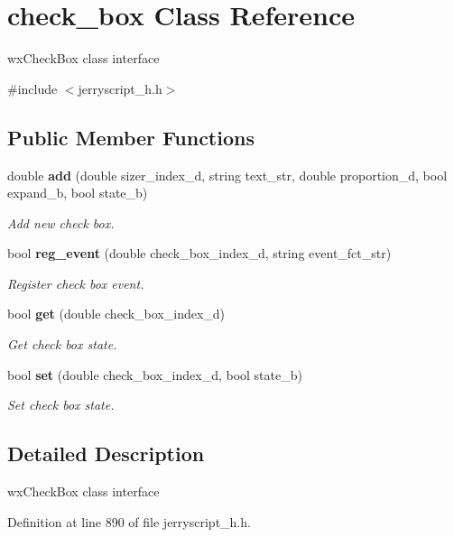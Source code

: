 \section{check\+\_\+box Class Reference}
\label{classcheck__box}


wx\+Check\+Box class interface  




{\ttfamily \#include $<$jerryscript\+\_\+h.\+h$>$}

\subsection*{Public Member Functions}
\begin{DoxyCompactItemize}
\item 
double \textbf{ add} (double sizer\+\_\+index\+\_\+d, string text\+\_\+str, double proportion\+\_\+d, bool expand\+\_\+b, bool state\+\_\+b)
\begin{DoxyCompactList}\small\item\em Add new check box. \end{DoxyCompactList}\item 
bool \textbf{ reg\+\_\+event} (double check\+\_\+box\+\_\+index\+\_\+d, string event\+\_\+fct\+\_\+str)
\begin{DoxyCompactList}\small\item\em Register check box event. \end{DoxyCompactList}\item 
bool \textbf{ get} (double check\+\_\+box\+\_\+index\+\_\+d)
\begin{DoxyCompactList}\small\item\em Get check box state. \end{DoxyCompactList}\item 
bool \textbf{ set} (double check\+\_\+box\+\_\+index\+\_\+d, bool state\+\_\+b)
\begin{DoxyCompactList}\small\item\em Set check box state. \end{DoxyCompactList}\end{DoxyCompactItemize}


\subsection{Detailed Description}
wx\+Check\+Box class interface 

Definition at line 890 of file jerryscript\+\_\+h.\+h.



